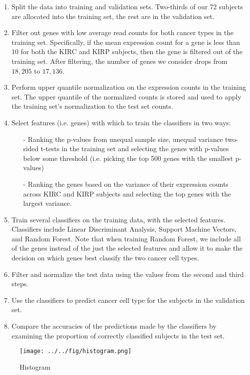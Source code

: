 \begin{enumerate}
\item Split the data into training and validation sets. Two-thirds of our 72 subjects are allocated into the training set,
the rest are in the validation set.
\item Filter out genes with low average read counts for both cancer types in the training set. Specifically, if the 
mean expression count for a gene is less than 10 for both the KIRC and KIRP subjects, then the gene is filtered out of the training
set. After filtering, the number of genes we consider drops from $18,205$ to $17,136$.
\item Perform upper quantile normalization on the expression counts in the training set. The upper quantile of the normalized counts is stored and used to apply the training set's normalization to the test set counts.
\item Select features (i.e. genes) with which to train the classifiers in two ways:
\begin{itemize}
\item[-] Ranking the p-values from unequal sample size, unequal variance two-sided t-tests in the training set and selecting the genes with p-values below some threshold (i.e. picking the top 500 genes with the smallest p-values)
\item[-] Ranking the genes based on the variance of their expression counts across KIRC and KIRP subjects and selecting the
top genes with the largest variance.
\end{itemize}
\item Train several classifiers on the training data, with the selected features. Classifiers include Linear Discriminant Analysis, Support Machine Vectors, and Random Forest. Note that when training Random Forest, we include all of the genes instead of the just the selected features and allow it to make the decision on which genes best classify the two cancer cell types.
\item Filter and normalize the test data using the values from the second and third steps. 
\item Use the classifiers to predict cancer cell type for the subjects in the validation set.
\item Compare the accuracies of the predictions made by the classifiers by examining the proportion of correctly classified
subjects in the test set.
\end{enumerate}

\begin{figure}[H]
  \centering
    \texttt{[image: ../../fig/histogram.png]}
\caption{Histogram }
   \label{fig:histogram}
\end{figure}


